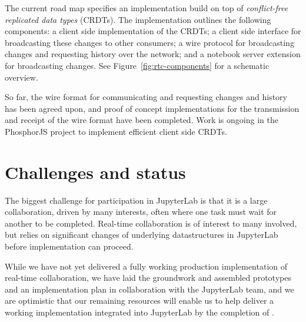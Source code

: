 \documentclass{deliverablereport}
\begin{document}
The current road map specifies an implementation build on top of
\emph{conflict-free replicated data types} (CRDTs). The implementation outlines the
following components: a client side implementation of the CRDTs; a client side interface
for broadcasting these changes to other consumers; a wire protocol for broadcasting
changes and requesting history over the network; and a notebook server extension for broadcasting changes. See Figure~\ref{fig:rtc-components} for a schematic overview.

So far, the wire format for communicating and requesting changes and history has been
agreed upon, and proof of concept implementations for the transmission and receipt of the
wire format have been completed. Work is ongoing in the PhosphorJS project to implement
efficient client side CRDTs.


\section{Challenges and status}

The biggest challenge for \ODK participation in JupyterLab is that it is a large collaboration, driven by many interests,
often where one task must wait for another to be completed.
Real-time collaboration is of interest to many involved,
but relies on significant changes of underlying datastructures in JupyterLab before implementation can proceed.

While we have not yet delivered a fully working production implementation of real-time collaboration,
we have laid the groundwork and assembled prototypes and an implementation plan
in collaboration with the JupyterLab team,
and we are optimistic that our remaining resources will enable us to help deliver a working implementation integrated into JupyterLab by the completion of .
\end{document}
